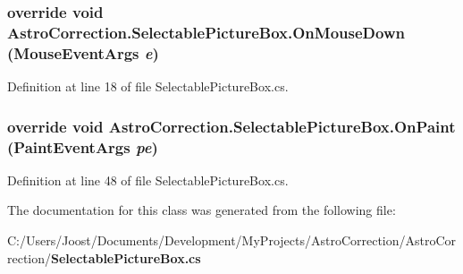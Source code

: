 \subsubsection[{OnMouseDown}]{\setlength{\rightskip}{0pt plus 5cm}override void AstroCorrection.SelectablePictureBox.OnMouseDown (MouseEventArgs {\em e})\hspace{0.3cm}{\ttfamily  [protected]}}\label{class_astro_correction_1_1_selectable_picture_box_abcb24e54b36f17a31be3549cdf0abf69}


Definition at line 18 of file SelectablePictureBox.cs.
\subsubsection[{OnPaint}]{\setlength{\rightskip}{0pt plus 5cm}override void AstroCorrection.SelectablePictureBox.OnPaint (PaintEventArgs {\em pe})\hspace{0.3cm}{\ttfamily  [protected]}}\label{class_astro_correction_1_1_selectable_picture_box_a3a34388b581990994a5ba41e136f7e9f}


Definition at line 48 of file SelectablePictureBox.cs.

The documentation for this class was generated from the following file:\begin{DoxyCompactItemize}
\item 
C:/Users/Joost/Documents/Development/MyProjects/AstroCorrection/AstroCorrection/{\bf SelectablePictureBox.cs}\end{DoxyCompactItemize}
